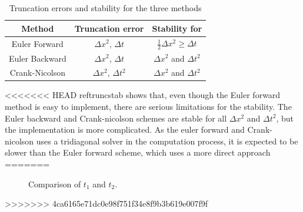 \documentclass[10pt,a4paper]{article}
\begin{document}
\begin{table}[H]
\centering
\begin{tabular}{|c|c|c|}
\hline
Method & Truncation error & Stability for\\
\hline
Euler Forward & $\Delta x^2$, $\Delta t$ & $\frac{1}{2} \Delta x^2 \geq \Delta t$\\
\hline
Euler Backward & $\Delta x^2$, $\Delta t$ & $\Delta x^2$ and $\Delta t^2$\\
\hline
Crank-Nicolson & $\Delta x^2$, $\Delta t^2$ & $\Delta x^2$ and $\Delta t^2$\\
\hline
\end{tabular}
\caption{Truncation errors and stability for the three methods}
\label{truncstab}
\end{table}

<<<<<<< HEAD
ref{truncstab} shows that, even though the Euler forward method is easy to implement, there are serious limitations for the stability. The Euler backward and Crank-nicolson schemes are stable for all $\Delta x^2$ and $\Delta t^2$, but the implementation is more complicated. As the euler forward and Crank-nicolson uses a tridiagonal solver in the computation process, it is expected to be slower than the Euler forward scheme, which uses a more direct approach  
=======
\begin{figure}[H]
 	\centering
  	\caption{\label{fig:5c}Comparison of $t_1$ and $t_2$.}
\end{figure}
>>>>>>> 4ca6165e71dc0e98f751f34e8f9b3b619e007f9f
\end{document}

